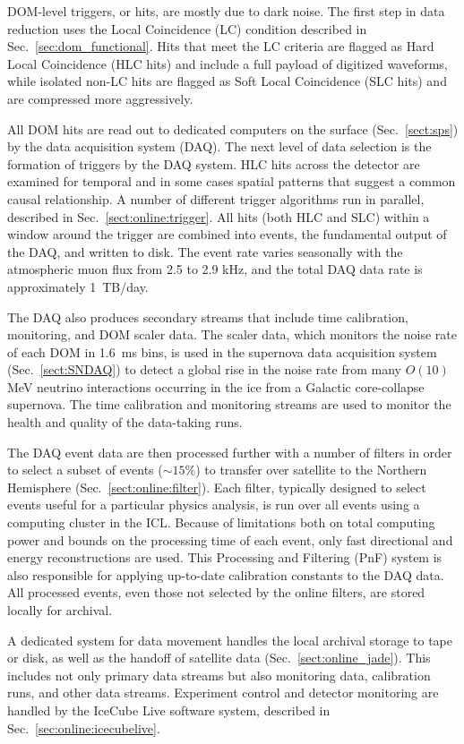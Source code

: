 DOM-level triggers, or hits, are mostly due to dark noise. The first step
in data reduction uses the Local Coincidence (LC) condition described in
Sec.~\ref{sec:dom_functional}.  Hits that meet the LC criteria are flagged
as Hard Local Coincidence (HLC hits) and include a full payload of
digitized waveforms, while isolated non-LC hits are flagged as Soft Local
Coincidence (SLC hits) and are compressed more aggressively.

All DOM hits are read out to dedicated computers on the surface
(Sec.~\ref{sect:sps}) by the data acquisition system (DAQ).  The next level
of data selection is the formation of triggers by the DAQ system. HLC hits across the detector are examined
for temporal and in some cases spatial patterns that suggest a common
causal relationship.  A number of different trigger algorithms run in
parallel, described in Sec.~\ref{sect:online:trigger}.  All hits (both HLC
and SLC) within a window around the trigger are combined into events, the
fundamental output of the DAQ, and written to disk.  The event rate varies
seasonally with the atmospheric muon flux from 2.5 to 2.9 kHz,
and the total DAQ data rate is approximately 1~TB/day.

The DAQ also produces secondary streams that include time calibration,
monitoring, and DOM scaler data.  The scaler data, which monitors the
noise rate of each DOM in 1.6~ms bins, is used in the supernova data
acquisition system (Sec.~\ref{sect:SNDAQ}) to detect a global rise in the
noise rate from many $O(10)$ MeV neutrino interactions occurring in the ice
from a Galactic core-collapse supernova.  The time calibration and
monitoring streams are used to monitor the health and quality of the
data-taking runs.

The DAQ event data are then processed further with a number of filters
in order to select a subset of events ($\sim15$\%) to transfer over
satellite to the Northern Hemisphere (Sec.~\ref{sect:online:filter}).  Each
filter, typically designed to select events useful for a particular physics
analysis, is run over all events using a computing cluster in the ICL.
Because of limitations both on total computing power and bounds on the
processing time of each event, only fast directional and energy
reconstructions are used.  This Processing and Filtering (PnF) system is
also responsible for applying up-to-date calibration constants to the DAQ
data. All processed events, even those not selected by the online filters,
are stored locally for archival.

A dedicated system for data movement handles the local archival storage to
tape or disk, as well as the handoff of satellite data
(Sec.~\ref{sect:online_jade}).  This includes not only primary data streams
but also monitoring data, calibration runs, and other data streams.
Experiment control and detector monitoring are handled by the IceCube Live
software system, described in Sec.~\ref{sec:online:icecubelive}.


